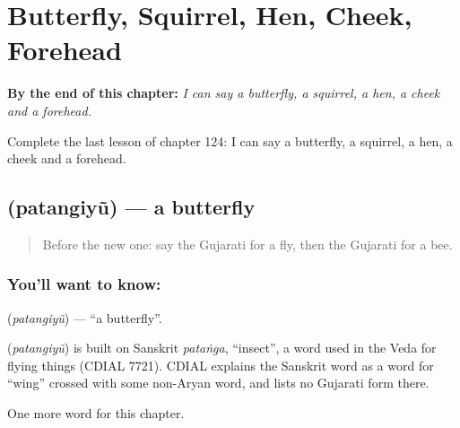 
\chapter{Butterfly, Squirrel, Hen, Cheek, Forehead}
\label{ch:gu-butterfly-squirrel-hen-cheek-forehead}

\begin{chapteropening}
\textbf{By the end of this chapter:} \emph{I can say a butterfly, a squirrel, a hen, a cheek and a forehead.}

Complete the last lesson of chapter 124: I can say a butterfly, a squirrel, a hen, a cheek and a forehead.
\end{chapteropening}

\section[\texorpdfstring{\gu{પતંગિયું} (patangiyũ)}{પતંગિયું (patangiyũ)}]{ (patangiyũ) — a butterfly}

\label{lesson:GU-C124-patangiyu}



\begin{quote}
Before the new one: say the Gujarati for a fly, then the Gujarati for a bee.
\end{quote}

\subsection*{You'll want to know: }
\textbf{} (\emph{patangiyũ}) — \textquotedblleft{}a butterfly\textquotedblright{}.

\begin{cousinweb}
\textbf{} (\emph{patangiyũ}) is built on Sanskrit \emph{pataṅga}, \textquotedblleft{}insect\textquotedblright{}, a word used in the Veda for flying things (CDIAL 7721). CDIAL explains the Sanskrit word as a word for \textquotedblleft{}wing\textquotedblright{} crossed with some non-Aryan word, and lists no Gujarati form there.
\end{cousinweb}

\begin{grammarlens}[title={What you've built}]
One more word for this chapter.
\end{grammarlens}

